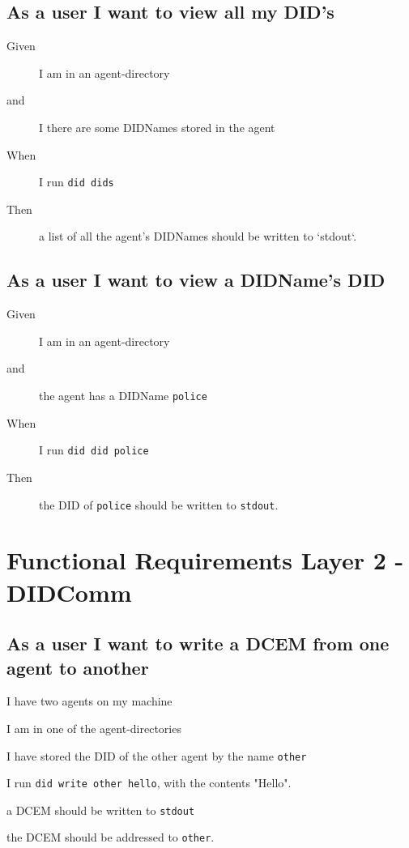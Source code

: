 \subsection{As a user I want to view all my DID's}
\begin{description}
    \item[Given] I am in an agent-directory
    \item[and] I there are some DIDNames stored in the agent
    \item[When] I run \texttt{did dids}
    \item[Then] a list of all the agent's DIDNames should be written to `stdout`.
\end{description}


\subsection{As a user I want to view a DIDName's DID}
\begin{description}
    \item[Given] I am in an agent-directory
    \item[and] the agent has a DIDName \texttt{police}
    \item[When] I run \texttt{did did police}
    \item[Then] the DID of \texttt{police} should be written to \texttt{stdout}.
\end{description}


\newpage

\section{Functional Requirements Layer 2 - DIDComm}

\subsection{As a user I want to write a DCEM from one agent to another}

\begin{description}[1.35cm]
    \item[Given] I have two agents on my machine
    \item[and] I am in one of the agent-directories
    \item[and] I have stored the DID of the other agent by the name \texttt{other}
    \item[When] I run \texttt{did write other hello}, with the contents "Hello".
    \item[Then] a DCEM should be written to \texttt{stdout}
    \item[and] the DCEM should be addressed to \texttt{other}. 
\end{description}

